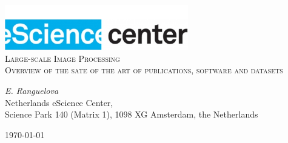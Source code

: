 \documentclass[a4paper,11pt]{article}
\begin{document}
\begin{titlepage}
\begin{center}
\includegraphics[width=0.6\textwidth]{fig/logo}\\[3cm]    
\textsc{\LARGE Large-scale Image Processing}\\[0.5cm]
\textsc{\large Overview of the sate of the art of publications, software and datasets}\\[0.5cm]
\vfill
\end{center}
{\large
\emph{E. Ranguelova} \\
}
{\large
{Netherlands eScience Center, \\
Science Park 140 (Matrix 1), 1098 XG Amsterdam, the Netherlands\\
}
}
\begin{center}
{\large \today}
\end{center}
\end{titlepage}

\tableofcontents

\newpage









\end{document}
